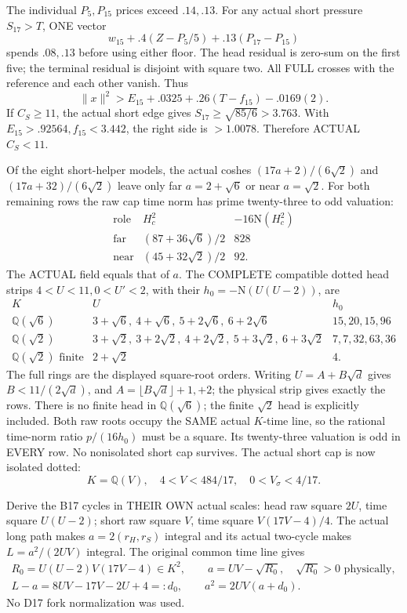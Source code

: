 \documentclass[11pt]{article}
\begin{document}
The individual \(P_5,P_{15}\) prices exceed
\(.14,.13\).
For any actual short pressure \(S_{17}>T\),
ONE vector
\[
 w_{15}+.4(Z-P_5/5)+.13(P_{17}-P_{15})
\]
spends \(.08,.13\) before using either floor.
The head residual is zero-sum on the first five;
the terminal residual is disjoint with square two.
All FULL crosses with the reference and each
other vanish.
Thus
\[
                 \|x\|^2>
                 E_{15}+.0325+.26(T-f_{15})-.0169(2).
\]
If \(C_S\ge11\), the actual short edge gives
\(S_{17}\ge\sqrt{85/6}>3.763\).
With \(E_{15}>.92564,f_{15}<3.442\),
the right side is \(>1.0078\).
Therefore ACTUAL \(C_S<11\).

Of the eight short-helper models, the actual
coshes
\((17a+2)/(6\sqrt2)\) and
\((17a+32)/(6\sqrt2)\)
leave only far \(a=2+\sqrt6\) or near
\(a=\sqrt2\).
For both remaining rows the raw cap time norm
has prime twenty-three to odd valuation:
\[
\begin{array}{c|c|c}
 \text{role}&H_c^2&-16\mathrm N(H_c^2)\\ \hline
 \text{far}&(87+36\sqrt6)/2&828\\
 \text{near}&(45+32\sqrt2)/2&92 .
\end{array}
\]
The ACTUAL field equals that of \(a\).
The COMPLETE compatible dotted head strips
\(4<U<11,0<U'<2\), with their
\(h_0=-\mathrm N(U(U-2))\), are
\[
\begin{array}{c|l|l}
 K&U&h_0\\ \hline
 \mathbb Q(\sqrt6)&
 3+\sqrt6,\ 4+\sqrt6,\ 5+2\sqrt6,\ 6+2\sqrt6&
 15,20,15,96\\
 \mathbb Q(\sqrt2)&
 3+\sqrt2,\ 3+2\sqrt2,\ 4+2\sqrt2,\ 5+3\sqrt2,\ 6+3\sqrt2&
 7,7,32,63,36\\
 \mathbb Q(\sqrt2)\text{ finite}&2+\sqrt2&4 .
\end{array}
\]
The full rings are the displayed square-root
orders.
Writing \(U=A+B\sqrt d\) gives
\(B<11/(2\sqrt d)\), and
\(A=\lfloor B\sqrt d\rfloor+1,+2\);
the physical strip gives exactly the rows.
There is no finite head in \(\mathbb Q(\sqrt6)\);
the finite \(\sqrt2\) head is explicitly included.
Both raw roots occupy the SAME actual \(K\)-time
line, so the rational time-norm ratio
\(p/(16h_0)\) must be a square.
Its twenty-three valuation is odd in EVERY row.
No nonisolated short cap survives.
The actual short cap is now isolated dotted:
\[
                 K=\mathbb Q(V),\quad
                 4<V<484/17,\quad0<V_\sigma<4/17 .
\]

Derive the B17 cycles in THEIR OWN actual scales:
head raw square \(2U\), time square \(U(U-2)\);
short raw square \(V\), time square \(V(17V-4)/4\).
The actual long path makes
\(a=2(r_H,r_S)\) integral and its actual
two-cycle makes \(L=a^2/(2UV)\) integral.
The original common time line gives
\[
 \begin{gathered}
 R_0=U(U-2)V(17V-4)\in K^2,\qquad
 a=UV-\sqrt{R_0},\quad\sqrt{R_0}>0\text{ physically},\\
 L-a=8UV-17V-2U+4=:d_0,\qquad
 a^2=2UV(a+d_0).
 \end{gathered}
\tag{B17C}\label{eq:arithB17cycles}
\]
No D17 fork normalization was used.
\end{document}
